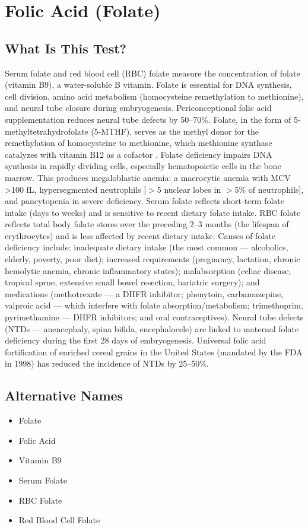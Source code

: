 \chapter{Folic Acid (Folate)}
\section*{What Is This Test?}
Serum folate and red blood cell (RBC) folate measure the concentration of folate (vitamin B9), a water-soluble B vitamin. Folate is essential for DNA synthesis, cell division, amino acid metabolism (homocysteine remethylation to methionine), and neural tube closure during embryogenesis. Periconceptional folic acid supplementation reduces neural tube defects by 50--70\%. Folate, in the form of 5-methyltetrahydrofolate (5-MTHF), serves as the methyl donor for the remethylation of homocysteine to methionine, which methionine synthase catalyzes with vitamin B12 as a cofactor \cite{bailey1999folate}. Folate deficiency impairs DNA synthesis in rapidly dividing cells, especially hematopoietic cells in the bone marrow. This produces megaloblastic anemia: a macrocytic anemia with MCV >100 fL, hypersegmented neutrophils [$>$5 nuclear lobes in $>$5\% of neutrophils], and pancytopenia in severe deficiency. Serum folate reflects short-term folate intake (days to weeks) and is sensitive to recent dietary folate intake. RBC folate reflects total body folate stores over the preceding 2--3 months (the lifespan of erythrocytes) and is less affected by recent dietary intake. Causes of folate deficiency include: inadequate dietary intake (the most common --- alcoholics, elderly, poverty, poor diet); increased requirements (pregnancy, lactation, chronic hemolytic anemia, chronic inflammatory states); malabsorption (celiac disease, tropical sprue, extensive small bowel resection, bariatric surgery); and medications (methotrexate --- a DHFR inhibitor; phenytoin, carbamazepine, valproic acid --- which interfere with folate absorption/metabolism; trimethoprim, pyrimethamine --- DHFR inhibitors; and oral contraceptives). Neural tube defects (NTDs --- anencephaly, spina bifida, encephalocele) are linked to maternal folate deficiency during the first 28 days of embryogenesis. Universal folic acid fortification of enriched cereal grains in the United States (mandated by the FDA in 1998) has reduced the incidence of NTDs by 25--50\%.
\section*{Alternative Names}
\begin{itemize}
  \item Folate
  \item Folic Acid
  \item Vitamin B9
  \item Serum Folate
  \item RBC Folate
  \item Red Blood Cell Folate
\end{itemize}
